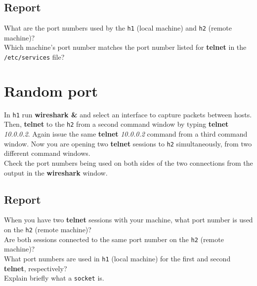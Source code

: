 \documentclass[10pt,a4paper]{article}
\numberwithin{equation}{section}
\numberwithin{figure}{section}
\numberwithin{table}{section}
\begin{document}
    \subsection*{Report}
    What are the port numbers used by the \texttt{h1} (local machine) and \texttt{h2} (remote machine)? \\
    Which machine’s port number matches the port number listed for \textbf{telnet} in the \texttt{/etc/services} file? \\

    \section{Random port}
    In \texttt{h1} run \textbf{wireshark \&} and select an interface to capture packets between hosts. \\
    Then, \textbf{telnet} to the \texttt{h2} from a second command window by typing \textbf{telnet} \textit{10.0.0.2}.
    Again issue the same \textbf{telnet} \textit{10.0.0.2} command from a third command window.
    Now you are opening two \textbf{telnet} sessions to \texttt{h2} simultaneously, from two different command windows. \\
    Check the port numbers being used on both sides of the two connections from the output in the \textbf{wireshark} window. \\
    \subsection*{Report}
    When you have two \textbf{telnet} sessions with your machine, what port number is used on the \texttt{h2} (remote machine)? \\
    Are both sessions connected to the same port number on the \texttt{h2} (remote machine)? \\
    What port numbers are used in \texttt{h1} (local machine) for the first and second \textbf{telnet}, respectively? \\
    Explain briefly what a \texttt{socket} is. \\
\end{document}
